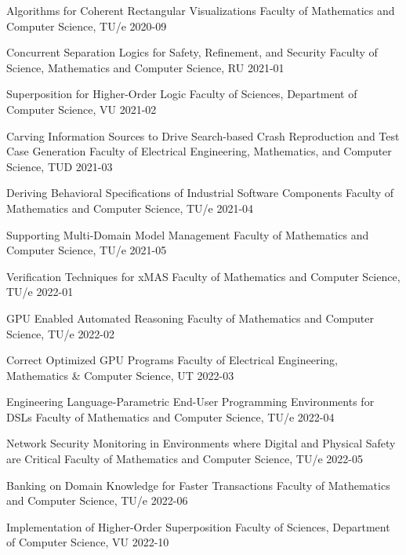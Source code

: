 \begin{multicols}{2}
         {Algorithms for Coherent Rectangular Visualizations}
         {Faculty of Mathematics and Computer Science, TU/e}
         {2020-09}

         {Concurrent Separation Logics for Safety, Refinement, and
Security}
         {Faculty of Science, Mathematics and Computer Science, RU}
		 {2021-01}

         {Superposition for Higher-Order Logic}
         {Faculty of Sciences, Department of Computer Science, VU}
         {2021-02}

         {Carving Information Sources to Drive Search-based Crash Reproduction and Test Case Generation}
         {Faculty of Electrical Engineering, Mathematics, and Computer Science, TUD}
         {2021-03}

         {Deriving Behavioral Specifications of Industrial Software Components}
         {Faculty of Mathematics and Computer Science, TU/e}
         {2021-04}

         {Supporting Multi-Domain Model Management}
         {Faculty of Mathematics and Computer Science, TU/e}
         {2021-05}

         {Verification Techniques for xMAS}
         {Faculty of Mathematics and Computer Science, TU/e}
         {2022-01}

         {GPU Enabled Automated Reasoning}
         {Faculty of Mathematics and Computer Science, TU/e}
         {2022-02}

         {Correct Optimized GPU Programs}
         {Faculty of Electrical Engineering, Mathematics \& Computer Science, UT}
         {2022-03}

         {Engineering Language-Parametric End-User Programming Environments for DSLs}
         {Faculty of Mathematics and Computer Science, TU/e}
         {2022-04}

         {Network Security Monitoring in Environments where Digital and Physical Safety are Critical}
         {Faculty of Mathematics and Computer Science, TU/e}
         {2022-05}
		 
         {Banking on Domain Knowledge for Faster Transactions}
         {Faculty of Mathematics and Computer Science, TU/e}
         {2022-06}
		
         {Implementation of Higher-Order Superposition}
         {Faculty of Sciences, Department of Computer Science, VU}
         {2022-10}

\end{multicols}

